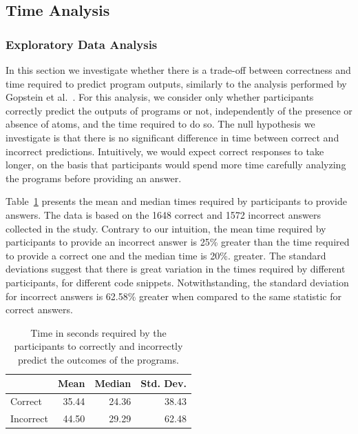 \subsection{Time Analysis}\label{sec:repeated:time}

\subsubsection*{Exploratory Data Analysis}

In this section we investigate whether there is a trade-off between correctness and time required to predict program outputs, similarly to the analysis performed by Gopstein et al.~\cite{DBLP:conf/sigsoft/GopsteinIYDZYC17}. For this analysis, we consider only whether participants correctly predict the outputs of programs or not, independently of the presence or absence of atoms, and the time required to do so. The null hypothesis we investigate is that there is no significant difference in time between correct and incorrect predictions. Intuitively, we would expect correct responses to take longer, on the basis that participants would spend more time carefully analyzing the programs before providing an answer. 

Table~\ref{tab:repeated:time} presents the mean and median times required by participants to provide answers. The data is based on the 1648 correct and 1572 incorrect answers collected in the study. Contrary to our intuition, the mean time required by participants to provide an incorrect answer is 25\% greater than the time required to provide a correct one and the median time is 20\%. greater. The standard deviations suggest that there is great variation in the times required by different participants, for different code snippets. Notwithstanding, the standard deviation for incorrect answers is 62.58\% greater when compared to the same statistic for correct answers. 

\begin{table}[tb]
  \caption{Time in seconds required by the participants to correctly and incorrectly predict the outcomes of the programs.}\label{tab:repeated:time}
  \centering
  \begin{tabular}{lrrr}
    \toprule  
             & Mean  & Median & Std. Dev. \\
    \midrule
  Correct   & 35.44 & 24.36  & 38.43     \\
  Incorrect & 44.50 & 29.29  & 62.48    \\
  \bottomrule
  \end{tabular}
  \end{table}

